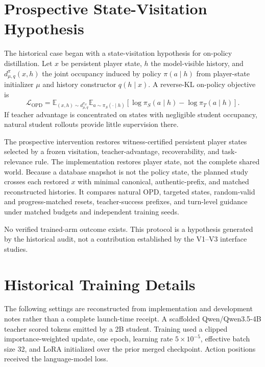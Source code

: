 \documentclass[10pt]{article}
\begin{document}
\section{Prospective State-Visitation Hypothesis}
\label{app:opd}

The historical case began with a state-visitation hypothesis for on-policy
distillation. Let $x$ be persistent player state, $h$ the model-visible history,
and $d^{\pi}_{\mu,q}(x,h)$ the joint occupancy induced by policy
$\pi(a\mid h)$ from player-state initializer $\mu$ and history constructor
$q(h\mid x)$. A reverse-KL on-policy objective is
\begin{equation}
\mathcal{L}_{\mathrm{OPD}}
=\mathbb{E}_{(x,h)\sim d^{\pi_S}_{\mu,q}}
  \mathbb{E}_{a\sim\pi_S(\cdot\mid h)}
  \left[\log\pi_S(a\mid h)-\log\pi_T(a\mid h)\right].
\end{equation}
If teacher advantage is concentrated on states with negligible student
occupancy, natural student rollouts provide little supervision there.

The prospective intervention restores witness-certified persistent player
states selected by a frozen visitation, teacher-advantage, recoverability, and
task-relevance rule. The implementation restores player state, not the complete
shared world. Because a database snapshot is not the policy state, the planned
study crosses each restored $x$ with minimal canonical, authentic-prefix, and
matched reconstructed histories. It compares natural OPD, targeted states,
random-valid and progress-matched resets, teacher-success prefixes, and
turn-level guidance under matched budgets and independent training seeds.

No verified trained-arm outcome exists. This protocol is a hypothesis generated
by the historical audit, not a contribution established by the V1--V3
interface studies.

\section{Historical Training Details}

The following settings are reconstructed from implementation and development
notes rather than a complete launch-time receipt. A scaffolded
Qwen/Qwen3.5-4B teacher scored tokens emitted by a 2B student. Training used a
clipped importance-weighted update, one epoch, learning rate
$5\times10^{-5}$, effective batch size 32, and LoRA initialized over the prior
merged checkpoint. Action positions received the language-model loss.
\end{document}

